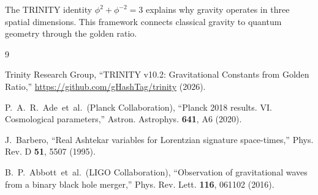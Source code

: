 \documentclass[12pt,a4paper]{article}
\begin{document}
The TRINITY identity $\phi^2 + \phi^{-2} = 3$ explains why gravity operates in three spatial dimensions. This framework connects classical gravity to quantum geometry through the golden ratio.

\begin{thebibliography}{9}

Trinity Research Group,
``TRINITY v10.2: Gravitational Constants from Golden Ratio,''
\url{https://github.com/gHashTag/trinity} (2026).

P.~A.~R.~Ade~et~al.~(Planck Collaboration),
``Planck 2018 results. VI. Cosmological parameters,''
Astron. Astrophys. \textbf{641}, A6 (2020).

J.~Barbero,
``Real Ashtekar variables for Lorentzian signature space-times,''
Phys. Rev. D \textbf{51}, 5507 (1995).

B.~P.~Abbott~et~al.~(LIGO Collaboration),
``Observation of gravitational waves from a binary black hole merger,''
Phys. Rev. Lett. \textbf{116}, 061102 (2016).

\end{thebibliography}
\end{document}
